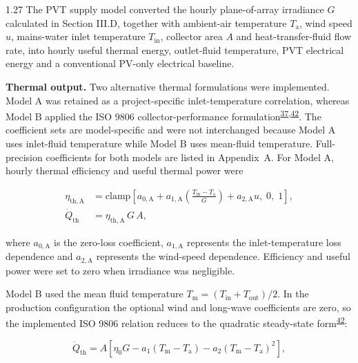 \documentclass[12pt,letterpaper]{article}
\DeclareRobustCommand{\citenum}[1]{\hyperlink{ref:#1}{#1}} %
\begin{document}
\begin{spacing}{1.27}
The PVT supply model converted the hourly plane-of-array irradiance $G$ calculated in Section III.D, together with ambient-air temperature $T_{\mathrm{a}}$, wind speed $u$, mains-water inlet temperature $T_{\mathrm{in}}$, collector area $A$ and heat-transfer-fluid flow rate, into hourly useful thermal energy, outlet-fluid temperature, PVT electrical energy and a conventional PV-only electrical baseline.\par

\vspace{0.15in}

\textbf{Thermal output.} Two alternative thermal formulations were implemented. Model A was retained as a project-specific inlet-temperature correlation, whereas Model B applied the ISO 9806 collector-performance formulation\textsuperscript{\citenum{37},\citenum{42}}. The coefficient sets are model-specific and were not interchanged because Model A uses inlet-fluid temperature while Model B uses mean-fluid temperature. Full-precision coefficients for both models are listed in Appendix~A. For Model A, hourly thermal efficiency and useful thermal power were

\begin{align}
\eta_{\mathrm{th,A}} &= \mathrm{clamp}\left[a_{0,\mathrm{A}} + a_{1,\mathrm{A}}\left(\frac{T_{\mathrm{in}}-T_{\mathrm{a}}}{G}\right) + a_{2,\mathrm{A}}u,\; 0,\; 1\right], \label{eq:etaA}\\
\dot{Q}_{\mathrm{th}} &= \eta_{\mathrm{th,A}}\,G\,A, \label{eq:qthA}
\end{align}

\noindent where $a_{0,\mathrm{A}}$ is the zero-loss coefficient, $a_{1,\mathrm{A}}$ represents the inlet-temperature loss dependence and $a_{2,\mathrm{A}}$ represents the wind-speed dependence. Efficiency and useful power were set to zero when irradiance was negligible.\par

\vspace{0.15in}

Model B used the mean fluid temperature $T_{\mathrm{m}}=\left(T_{\mathrm{in}}+T_{\mathrm{out}}\right)/2$. In the production configuration the optional wind and long-wave coefficients are zero, so the implemented ISO 9806 relation reduces to the quadratic steady-state form\textsuperscript{\citenum{42}}:

\begin{equation}
\dot{Q}_{\mathrm{th}} = A\left[\eta_0 G - a_1\left(T_{\mathrm{m}}-T_{\mathrm{a}}\right) - a_2\left(T_{\mathrm{m}}-T_{\mathrm{a}}\right)^2\right],
\label{eq:qthB}
\end{equation}


\end{spacing}
\end{document}
